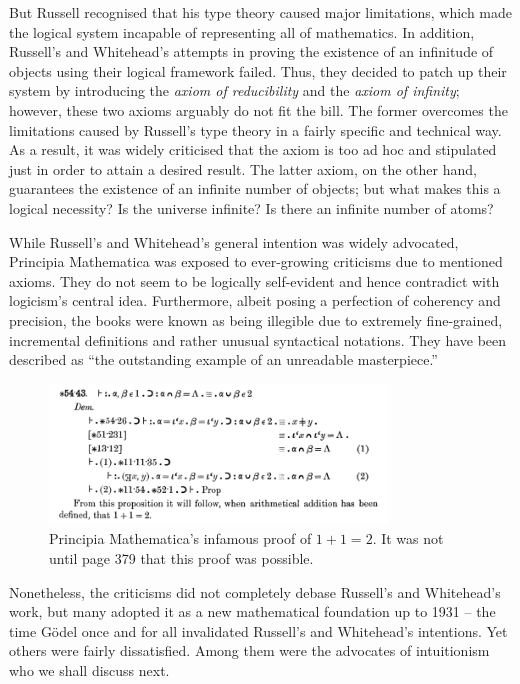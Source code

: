 \documentclass{article}
\begin{document}
But Russell recognised that his type theory caused major limitations, which made the logical system incapable of representing all of mathematics. In addition, Russell's and Whitehead's attempts in proving the existence of an infinitude of objects using their logical framework failed. Thus, they decided to patch up their system by introducing the \textit{axiom of reducibility} and the \textit{axiom of infinity}; however, these two axioms arguably do not fit the bill. The former overcomes the limitations caused by Russell's type theory in a fairly specific and technical way. As a result, it was widely criticised that the axiom is too ad hoc and stipulated just in order to attain a desired result.
The latter axiom, on the other hand, guarantees the existence of an infinite number of objects; but what makes this a logical necessity? Is the universe infinite? Is there an infinite number of atoms?

While Russell's and Whitehead's general intention was widely advocated, Principia Mathematica was exposed to ever-growing criticisms due to mentioned axioms. They do not seem to be logically self-evident and hence contradict with logicism's central idea. Furthermore, albeit posing a perfection of coherency and precision, the books were known as being illegible due to extremely fine-grained, incremental definitions and rather unusual syntactical notations. They have been described as ``the outstanding example of an unreadable masterpiece.''\cite[p.~154]{math_experience}

\begin{figure}[h]
	\centering
	\includegraphics[width=0.8\textwidth]{img/principia_mathematica.png}
	\caption{Principia Mathematica's infamous proof of $1+1=2$. It was not until page 379 that this proof was possible.}
\end{figure}
Nonetheless, the criticisms did not completely debase Russell's and Whitehead's work, but many adopted it as a new mathematical foundation up to 1931 -- the time Gödel once and for all invalidated Russell's and Whitehead's intentions. Yet others were fairly dissatisfied. Among them were the advocates of intuitionism who we shall discuss next.
\end{document}
